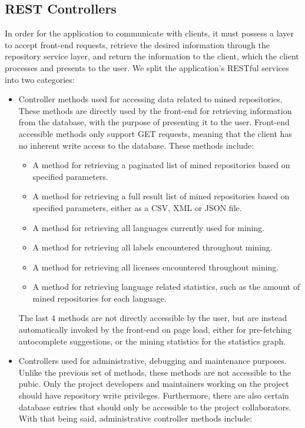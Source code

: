 \subsection{REST Controllers}

In order for the application to communicate with clients, it must possess a layer to accept front-end requests, retrieve the desired information through the repository service layer, and return the information to the client, which the client processes and presents to the user. We split the application's RESTful services into two categories:

\begin{itemize}
    \item Controller methods used for accessing data related to mined repositories.
    \\These methods are directly used by the front-end for retrieving information from the database, with the purpose of presenting it to the user. Front-end accessible methods only support GET requests, meaning that the client has no inherent write access to the database. These methods include:
    \begin{itemize}
        \item A method for retrieving a paginated list of mined repositories based on specified parameters.
        \item A method for retrieving a full result list of mined repositories based on specified parameters, either as a CSV, XML or JSON file.
        \item A method for retrieving all languages currently used for mining.
        \item A method for retrieving all labels encountered throughout mining.
        \item A method for retrieving all licenses encountered throughout mining.
        \item A method for retrieving language related statistics, such as the amount of mined repositories for each language.
    \end{itemize}
    The last 4 methods are not directly accessible by the user, but are instead automatically invoked by the front-end on page load, either for pre-fetching autocomplete suggestions, or the mining statistics for the statistics graph.
    \item Controllers used for administrative, debugging and maintenance purposes.
    \\Unlike the previous set of methods, these methods are not accessible to the pubic. Only the project developers and maintainers working on the project should have repository write privileges. Furthermore, there are also certain database entries that should only be accessible to the project collaborators. With that being said, administrative controller methods include:

\end{itemize}
